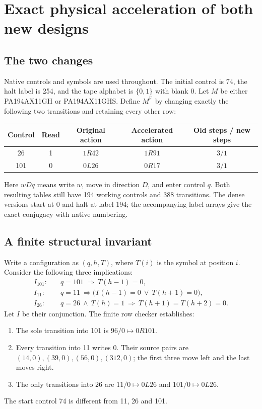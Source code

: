 \section{Exact physical acceleration of both new designs}
\label{sec:acceleration}
\subsection{The two changes}
Native controls and symbols are used throughout. The initial control is 74,
the halt label is 254, and the tape alphabet is $\{0,1\}$ with blank 0.
Let $M$ be either PA194AX11GH or PA194AX11GHS. Define $M^{\mathrm F}$ by
changing exactly the following two transitions and retaining every other row:
\begin{center}
\begin{tabular}{ccccc}
\toprule
Control & Read & Original action & Accelerated action & Old steps / new steps\\
\midrule
26 & 1 & $1R42$ & $1R91$ & $3/1$\\
101 & 0 & $0L26$ & $0R17$ & $3/1$\\
\bottomrule
\end{tabular}
\end{center}
Here $wDq$ means write $w$, move in direction $D$, and enter control $q$.
Both resulting tables still have 194 working controls and 388 transitions.
The dense versions start at 0 and halt at label 194; the accompanying label
arrays give the exact conjugacy with native numbering.

\subsection{A finite structural invariant}
Write a configuration as $(q,h,T)$, where $T(i)$ is the symbol at position $i$.
Consider the following three implications:
\begin{align*}
I_{101}:\quad &q=101\ \Longrightarrow\ T(h-1)=0,\\
I_{11}:\quad &q=11\ \Longrightarrow\bigl(T(h-1)=0\ \lor\ T(h+1)=0\bigr),\\
I_{26}:\quad &q=26\ \land\ T(h)=1\ \Longrightarrow\ T(h+1)=T(h+2)=0.
\end{align*}
Let $I$ be their conjunction. The finite row checker establishes:
\begin{enumerate}
\item The sole transition into 101 is $96/0\mapsto0R101$.
\item Every transition into 11 writes 0. Their source pairs are
$(14,0),(39,0),(56,0),(312,0)$; the first three move left and the last moves right.
\item The only transitions into 26 are $11/0\mapsto0L26$ and
$101/0\mapsto0L26$.
\end{enumerate}
The start control 74 is different from 11, 26 and 101.

